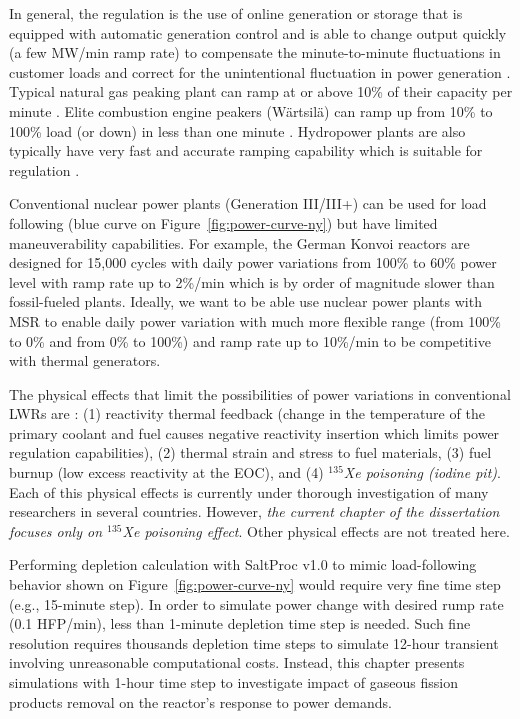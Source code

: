In general, the regulation is the use of online generation or storage that is 
equipped with automatic generation control and is able to change output 
quickly (a few MW/min ramp rate) to compensate the minute-to-minute 
fluctuations in 
customer loads and correct for the unintentional fluctuation in power 
generation \cite{kirby_method_2005}. Typical natural gas peaking plant can 
ramp at or above 10\% of their capacity per minute \cite{huff_enabling_2018}. 
Elite combustion engine peakers (W\"{a}rtsil\"{a}) can ramp up from 10\% to 
100\% load (or down) in less than one minute \cite{wartsila_combustion_2020}.
Hydropower plants are also typically have very fast and accurate ramping 
capability which is suitable for regulation \cite{kirby_method_2005}.

Conventional nuclear power plants (Generation III/III+) can be used for 
load following (blue curve on Figure~\ref{fig:power-curve-ny}) but have 
limited maneuverability capabilities. For example, the German Konvoi reactors 
are designed for 15,000 cycles with daily power variations from 100\% to 60\% 
power level with ramp rate up to 2\%/min \cite{ludwig_load_2011} which is by 
order of magnitude slower than fossil-fueled plants. Ideally, we want to be 
able use nuclear power plants with \gls{MSR} to enable daily power variation 
with much more flexible range (from 100\% to 0\% and from 0\% to 100\%) and 
ramp rate up to 10\%/min to be competitive with thermal generators.

The physical effects that limit the possibilities of power variations in 
conventional \glspl{LWR} are \cite{lokhov_technical_2011}: (1) reactivity 
thermal feedback (change in the temperature of the primary coolant and fuel 
causes negative reactivity insertion which limits power regulation 
capabilities), (2) thermal strain and stress to fuel materials, (3) fuel 
burnup (low excess reactivity at the \gls{EOC}), and (4) \emph{$^{135}$Xe 
poisoning (iodine pit)}. Each of this physical effects is currently under 
thorough investigation of many researchers in several countries. However, 
\emph{the current chapter of the dissertation focuses only on $^{135}$Xe  
poisoning effect}. Other physical effects are not treated here.

Performing depletion calculation with SaltProc v1.0 to mimic load-following 
behavior shown on Figure~\ref{fig:power-curve-ny} would require very fine time 
step (e.g., 15-minute step). In order to simulate power change with desired 
rump rate (0.1 \gls{HFP}/min), less than 1-minute depletion time step is 
needed. 
Such fine resolution requires thousands depletion time steps to simulate 
12-hour transient involving unreasonable computational costs. 
Instead, this chapter presents simulations with 1-hour time step to 
investigate impact of gaseous fission products removal on the reactor's 
response to power demands. 

